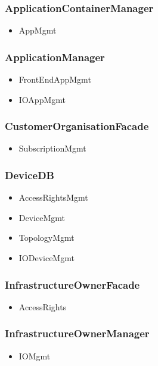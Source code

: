     \subsubsection{ApplicationContainerManager}
        \begin{itemize}
            \item AppMgmt
        \end{itemize}

    \subsubsection{ApplicationManager}
        \begin{itemize}
            \item FrontEndAppMgmt
            \item IOAppMgmt
        \end{itemize}

    \subsubsection{CustomerOrganisationFacade}
        \begin{itemize}
            \item SubscriptionMgmt
        \end{itemize}

    \subsubsection{DeviceDB}
        \begin{itemize}
            \item AccessRightsMgmt
            \item DeviceMgmt
            \item TopologyMgmt
            \item IODeviceMgmt
        \end{itemize}

    \subsubsection{InfrastructureOwnerFacade}
        \begin{itemize}
            \item AccessRights
        \end{itemize}

    \subsubsection{InfrastructureOwnerManager}
        \begin{itemize}
            \item IOMgmt
        \end{itemize}

